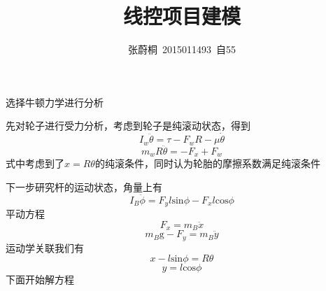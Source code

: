 \documentclass[UTF8,a4paper]{ctexart}
\title{线控项目建模}
\author{张蔚桐\ 2015011493\ 自55}
\begin{document}
\maketitle
选择牛顿力学进行分析

先对轮子进行受力分析，考虑到轮子是纯滚动状态，得到
\begin{equation}
I_w\ddot{\theta}=\tau-F_wR-\mu\dot{\theta}
\label{1}
\end{equation}
\begin{equation}
m_wR\ddot{\theta}=-F_x+F_w
\label{2}
\end{equation}
式中考虑到了$x=R\theta$的纯滚条件，同时认为轮胎的摩擦系数满足纯滚条件

下一步研究杆的运动状态，角量上有
\begin{equation}
I_B\ddot{\phi}=F_yl\mathrm{sin}\phi-F_xl\mathrm{cos}\phi
\label{3}
\end{equation}
平动方程
\begin{equation}
F_x=m_B\ddot{x}
\label{4}
\end{equation}
\begin{equation}
m_B\mathrm{g}-F_y=m_B\ddot{y}
\label{5}
\end{equation}
运动学关联我们有
\begin{equation}
x-l\mathrm{sin}\phi=R\theta
\label{6}
\end{equation}
\begin{equation}
y=l\mathrm{cos}\phi
\label{7}
\end{equation}
下面开始解方程
\end{document}
